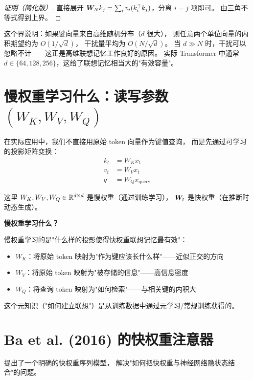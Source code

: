 \begin{proof}[证明（简化版）]
直接展开 $\boldsymbol{W}_N k_j = \sum_i v_i (k_i^\top k_j)$，分离 $i=j$ 项即可。
由三角不等式得到上界。
\end{proof}

\begin{remark}
这个界说明：如果键向量来自高维随机分布（$d$ 很大），
则任意两个单位向量的内积期望约为 $O(1/\sqrt{d})$，
干扰量平均为 $O(N/\sqrt{d})$。
当 $d \gg N$ 时，干扰可以忽略不计——这正是高维联想记忆工作良好的原因。
实际 Transformer 中通常 $d \in \{64, 128, 256\}$，这给了联想记忆相当大的"有效容量"。
\end{remark}

\section{慢权重学习什么：读写参数 $(W_K, W_V, W_Q)$}
\label{sec:fastweights_projections}

在实际应用中，我们不直接用原始 token 向量作为键值查询，
而是先通过可学习的投影矩阵变换：
\begin{align}
  k_t &= W_K x_t \label{eq:proj_k} \\
  v_t &= W_V x_t \label{eq:proj_v} \\
  q   &= W_Q x_\text{query} \label{eq:proj_q}
\end{align}

这里 $W_K, W_V, W_Q \in \mathbb{R}^{d \times d}$ 是慢权重（通过训练学习），
$\boldsymbol{W}_t$ 是快权重（在推断时动态生成）。

\textbf{慢权重学习什么？}

慢权重学习的是"什么样的投影使得快权重联想记忆最有效"：
\begin{itemize}
  \item $W_K$：将原始 token 映射为"作为键应该长什么样"——近似正交的方向
  \item $W_V$：将原始 token 映射为"被存储的信息"——高信息密度
  \item $W_Q$：将查询 token 映射为"如何检索"——与相关键的内积大
\end{itemize}

这个元知识（"如何建立联想"）是从训练数据中通过元学习/常规训练获得的。

\section{Ba et al. (2016) 的快权重注意器}
\label{sec:ba2016}

\citet{ba2016fastweights} 提出了一个明确的快权重序列模型，
解决"如何把快权重与神经网络隐状态结合"的问题。

